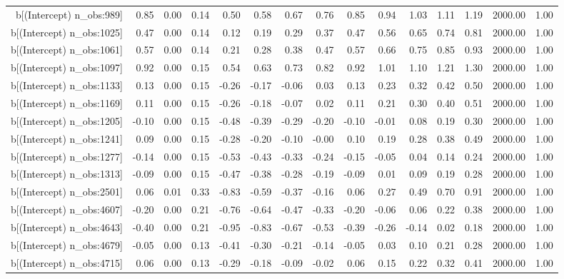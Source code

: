 \begin{table}[ht]
\begin{tabular}{rrrrrrrrrrrrrrr}
  b[(Intercept) n\_obs:989] & 0.85 & 0.00 & 0.14 & 0.50 & 0.58 & 0.67 & 0.76 & 0.85 & 0.94 & 1.03 & 1.11 & 1.19 & 2000.00 & 1.00 \\ 
  b[(Intercept) n\_obs:1025] & 0.47 & 0.00 & 0.14 & 0.12 & 0.19 & 0.29 & 0.37 & 0.47 & 0.56 & 0.65 & 0.74 & 0.81 & 2000.00 & 1.00 \\ 
  b[(Intercept) n\_obs:1061] & 0.57 & 0.00 & 0.14 & 0.21 & 0.28 & 0.38 & 0.47 & 0.57 & 0.66 & 0.75 & 0.85 & 0.93 & 2000.00 & 1.00 \\ 
  b[(Intercept) n\_obs:1097] & 0.92 & 0.00 & 0.15 & 0.54 & 0.63 & 0.73 & 0.82 & 0.92 & 1.01 & 1.10 & 1.21 & 1.30 & 2000.00 & 1.00 \\ 
  b[(Intercept) n\_obs:1133] & 0.13 & 0.00 & 0.15 & -0.26 & -0.17 & -0.06 & 0.03 & 0.13 & 0.23 & 0.32 & 0.42 & 0.50 & 2000.00 & 1.00 \\ 
  b[(Intercept) n\_obs:1169] & 0.11 & 0.00 & 0.15 & -0.26 & -0.18 & -0.07 & 0.02 & 0.11 & 0.21 & 0.30 & 0.40 & 0.51 & 2000.00 & 1.00 \\ 
  b[(Intercept) n\_obs:1205] & -0.10 & 0.00 & 0.15 & -0.48 & -0.39 & -0.29 & -0.20 & -0.10 & -0.01 & 0.08 & 0.19 & 0.30 & 2000.00 & 1.00 \\ 
  b[(Intercept) n\_obs:1241] & 0.09 & 0.00 & 0.15 & -0.28 & -0.20 & -0.10 & -0.00 & 0.10 & 0.19 & 0.28 & 0.38 & 0.49 & 2000.00 & 1.00 \\ 
  b[(Intercept) n\_obs:1277] & -0.14 & 0.00 & 0.15 & -0.53 & -0.43 & -0.33 & -0.24 & -0.15 & -0.05 & 0.04 & 0.14 & 0.24 & 2000.00 & 1.00 \\ 
  b[(Intercept) n\_obs:1313] & -0.09 & 0.00 & 0.15 & -0.47 & -0.38 & -0.28 & -0.19 & -0.09 & 0.01 & 0.09 & 0.19 & 0.28 & 2000.00 & 1.00 \\ 
  b[(Intercept) n\_obs:2501] & 0.06 & 0.01 & 0.33 & -0.83 & -0.59 & -0.37 & -0.16 & 0.06 & 0.27 & 0.49 & 0.70 & 0.91 & 2000.00 & 1.00 \\ 
  b[(Intercept) n\_obs:4607] & -0.20 & 0.00 & 0.21 & -0.76 & -0.64 & -0.47 & -0.33 & -0.20 & -0.06 & 0.06 & 0.22 & 0.38 & 2000.00 & 1.00 \\ 
  b[(Intercept) n\_obs:4643] & -0.40 & 0.00 & 0.21 & -0.95 & -0.83 & -0.67 & -0.53 & -0.39 & -0.26 & -0.14 & 0.02 & 0.18 & 2000.00 & 1.00 \\ 
  b[(Intercept) n\_obs:4679] & -0.05 & 0.00 & 0.13 & -0.41 & -0.30 & -0.21 & -0.14 & -0.05 & 0.03 & 0.10 & 0.21 & 0.28 & 2000.00 & 1.00 \\ 
  b[(Intercept) n\_obs:4715] & 0.06 & 0.00 & 0.13 & -0.29 & -0.18 & -0.09 & -0.02 & 0.06 & 0.15 & 0.22 & 0.32 & 0.41 & 2000.00 & 1.00 \\ 

\end{tabular}
\end{table}
